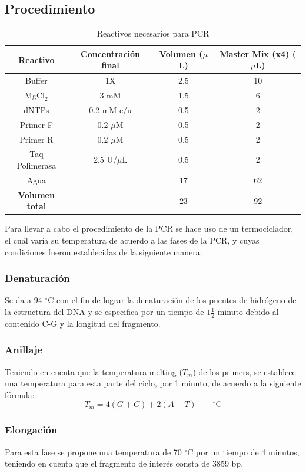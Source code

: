 \documentclass[12pt]{article}
\begin{document}
		\subsection{Procedimiento}
		\begin{table}[h]
			\centering
			\caption{Reactivos necesarios para PCR}
			\begin{tabular}{c|ccc}
				\hline
				\textbf{Reactivo} & \textbf{Concentración final} & \textbf{Volumen} ($\mu$L) & \textbf{Master Mix (x4)} ($\mu$L) \\
				\hline
				Buffer & 1X & 2.5 & 10\\
				MgCl$_2$ & 3 mM & 1.5 & 6\\
				dNTPs &	0.2 mM c/u & 0.5 & 2\\
				Primer F & 0.2 $\mu$M & 0.5 & 2\\
				Primer R & 0.2 $\mu$M & 0.5 & 2\\
				Taq Polimerasa & 2.5 U/$\mu$L & 0.5 & 2\\
				Agua & & 17 & 62 \\
				\hline
				\textbf{Volumen total} & & 23 & 92\\
				\hline
			\end{tabular}
		\end{table}
		
		Para llevar a cabo el procedimiento de la PCR se hace uso de un termociclador, el cuál varía su temperatura de acuerdo a las fases de la PCR, y cuyas condiciones fueron establecidas de la siguiente manera:
		\subsubsection{Denaturación} Se da a 94 $^\circ$C con el fin de lograr la denaturación de los puentes de hidrógeno de la estructura del DNA y se especifica por un tiempo de $1\frac{1}{2}$ minuto debido al contenido C-G y la longitud del fragmento.
		\subsubsection{Anillaje} Teniendo en cuenta que la temperatura melting ($T_m$) de los primers, se establece una temperatura para esta parte del ciclo, por 1 minuto, de acuerdo a la siguiente fórmula:
		\begin{equation}
			T_m = 4(G+C) + 2(A+T)\qquad ^\circ \text{C}
		\end{equation}
		
		\subsubsection{Elongación} Para esta fase se propone una temperatura de 70 $^\circ$C por un tiempo de 4 minutos, teniendo en cuenta que el fragmento de interés consta de 3859 bp.
		
\end{document}
